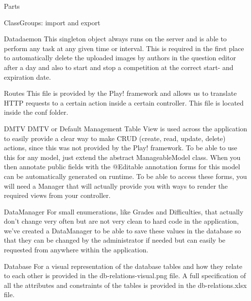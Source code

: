 \documentclass[]{article}
\begin{document}
\begin{section}{Parts}
\begin{subsection}{ClassGroups: import and export}
    \end{subsection}
    \begin{subsection}{Datadaemon}
        This singleton object always runs on the server and is able to perform
        any task at any given time or interval. This is required in the first place to automatically delete
        the uploaded images by authors in the question editor after a day and also to start and
        stop a competition at the correct start- and expiration date.
    \end{subsection}
    \begin{subsection}{Routes}
        This file is provided by the Play! framework and allows us to translate HTTP requests
        to a certain action inside a certain controller.
        This file is located inside the conf folder.
    \end{subsection}
    \begin{subsection}{DMTV}
        DMTV or Default Management Table View is used across the application to easily
        provide a clear way to make CRUD (create, read, update, delete) actions, since this
        was not provided by the Play! framework.
        To be able to use this for any model, just extend the abstract ManageableModel class.
        When you then annotate public fields with the @Editable annotation forms for this model
        can be automatically generated on runtime. To be able to access these forms, you will
        need a Manager that will actually provide you with ways to render the required
        views from your controller.
    \end{subsection}
    \begin{subsection}{DataManager}
        For small enumerations, like Grades and Difficulties, that actually don't change very
        often but are not very clean to hard code in the application, we've created a DataManager
        to be able to save these values in the database so that they can be changed by the
        administrator if needed but can easily be requested from anywhere within the application.
    \end{subsection}
    \begin{subsection}{Database}
        For a visual representation of the database tables and how they relate to each other is provided in the db-relations-visual.png file. A full specification of all the attributes and constraints of the tables is provided in the db-relations.xlsx file.
    \end{subsection}
\end{section}
\end{document}
